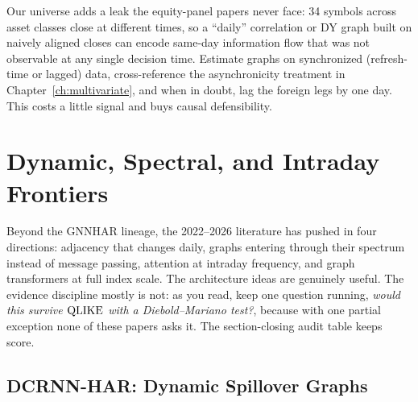 \begin{projectconnection}
Our universe adds a leak the equity-panel papers never face: 34 symbols across asset classes close at different times, so a ``daily'' correlation or DY graph built on naively aligned closes can encode same-day information flow that was not observable at any single decision time. Estimate graphs on synchronized (refresh-time or lagged) data, cross-reference the asynchronicity treatment in Chapter~\ref{ch:multivariate}, and when in doubt, lag the foreign legs by one day. This costs a little signal and buys causal defensibility.
\end{projectconnection}

\section{Dynamic, Spectral, and Intraday Frontiers}\label{sec:gnn:frontiers}

Beyond the GNNHAR lineage, the 2022--2026 literature has pushed in four directions: adjacency that changes daily, graphs entering through their spectrum instead of message passing, attention at intraday frequency, and graph transformers at full index scale. The architecture ideas are genuinely useful. The evidence discipline mostly is not: as you read, keep one question running, \emph{would this survive $\operatorname{QLIKE}$ with a Diebold--Mariano test?}, because with one partial exception none of these papers asks it. The section-closing audit table keeps score.

\subsection{DCRNN-HAR: Dynamic Spillover Graphs}\label{sec:gnn:dcrnn}

